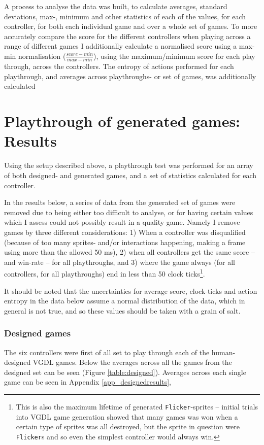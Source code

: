 \documentclass[a4paper,titlepage,final]{report}
\begin{document}
A process to analyse the data was built, to calculate averages, standard deviations, max-, minimum and other statistics of each of the values, for each controller, for both each individual game and over a whole set of games.
To more accurately compare the score for the different controllers when playing across a range of different games  I additionally calculate a normalised score using a max-min normalisation ($\frac{score-min}{max-min}$), using the maximum/minimum score for each play through, across the controllers. 
The entropy of actions performed for each playthrough, and averages across playthroughs- or set of games, was additionally calculated

\section{Playthrough of generated games: Results}
\label{sec_task1inittestresults}
Using the setup described above, a playthrough test was performed for an array of both designed- and generated games, and a set of statistics calculated for each controller.

In the results below, a series of data from the generated set of games were removed due to being either too difficult to analyse, or for having certain values which I assess could not possibly result in a quality game.
Namely I remove games by three different considerations: 
1) When a controller was disqualified (because of too many sprites- and/or interactions happening, making a frame using more than the allowed 50 ms), 2) when all controllers get the same score -- and win-rate -- for all playthroughs, and 3) where the game always (for all controllers, for all playthroughs) end in less than 50 clock ticks\footnote{This is also the maximum lifetime of generated \texttt{Flicker}-sprites -- initial trials into VGDL game generation showed that many games was won when a certain type of sprites was all destroyed, but the sprite in question were \texttt{Flicker}s and so even the simplest controller would always win.}.

It should be noted that the uncertainties for average score, clock-ticks and action entropy in the data below assume a normal distribution of the data, which in general is not true, and so these values should be taken with a grain of salt.

\subsubsection*{Designed games}
The six controllers were first of all set to play through each of the human-designed VGDL games.
Below the averages across all the games from the designed set can be seen (Figure \ref{table:designed}). 
Averages across each single game can be seen in Appendix \ref{app_designedresults}, 
\end{document}
